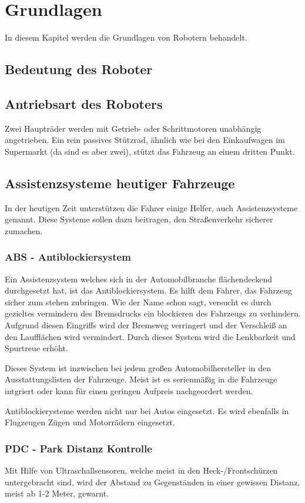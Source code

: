 \chapter{Grundlagen}
In diesem Kapitel werden die Grundlagen von Robotern behandelt.
\section{Bedeutung des Roboter}
\section{Antriebsart des Roboters}
Zwei Haupträder werden mit Getrieb- oder Schrittmotoren unabhängig angetrieben. Ein rein passives Stützrad, ähnlich wie bei den Einkaufwagen im Supermarkt (da sind es aber zwei), stützt das Fahrzeug an einem dritten Punkt.

\section{Assistenzsysteme heutiger Fahrzeuge}
In der heutigen Zeit unterstützen die Fahrer einige Helfer, auch Assistenzsysteme genannt. Diese Systeme sollen dazu beitragen, den Straßenverkehr sicherer zumachen.
\subsection{ABS - Antiblockiersystem}
Ein Assistenzsystem welches sich in der Automobilbranche flächendeckend durchgesetzt hat, ist das Antiblockiersystem. Es hilft dem Fahrer, das Fahrzeug sicher zum stehen zubringen. Wie der Name schon sagt, versucht es durch gezieltes vermindern des Bremsdrucks ein blockieren des Fahrzeugs zu verhindern. Aufgrund diesen Eingriffs wird der Bremsweg verringert und der Verschleiß an den Laufflächen wird vermindert. Durch dieses System wird die Lenkbarkeit und Spurtreue erhöht.

Dieses System ist inzwischen bei jedem großen Automobilhersteller in den Ausstattungslisten der Fahrzeuge. Meist ist es serienmäßig in die Fahrzeuge intgriert oder kann für einen geringen Aufpreis nachgeordert werden. 

Antiblockierysteme werden nicht nur bei Autos eingesetzt. Es wird ebenfalls in Flugzeugen Zügen und Motorrädern eingesetzt. 

\subsection{PDC - Park Distanz Kontrolle}
Mit Hilfe von Ultraschallsensoren, welche meist in den Heck-/Frontschürzen untergebracht sind, wird der Abstand zu Gegenständen in einer gewissen Distanz, meist ab 1-2 Meter, gewarnt. 

